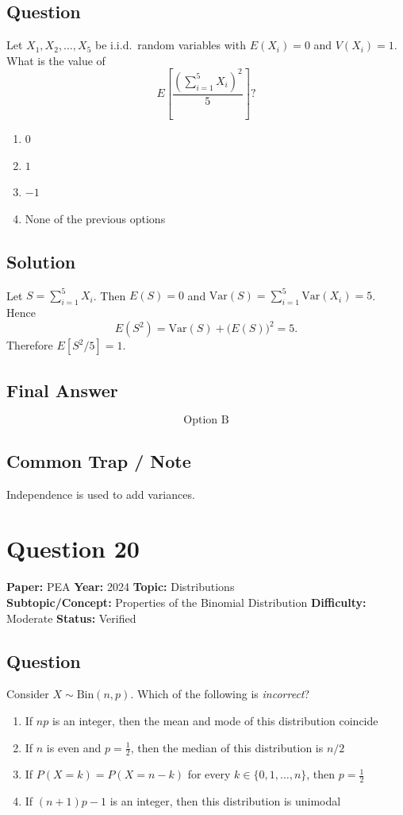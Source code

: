 \documentclass[11pt]{article}
\begin{document}
\subsection*{Question}
Let $X_1,X_2,\dots,X_5$ be i.i.d.\ random variables with $E(X_i)=0$ and $V(X_i)=1$. What is the value of
\[
E\!\left[\frac{(\sum_{i=1}^{5} X_i)^{2}}{5}\right]?
\]
\begin{enumerate}[label=(\Alph*)]
\item $0$
\item $1$
\item $-1$
\item None of the previous options
\end{enumerate}

\subsection*{Solution}
Let $S=\sum_{i=1}^{5} X_i$. Then $E(S)=0$ and $\mathrm{Var}(S)=\sum_{i=1}^{5}\mathrm{Var}(X_i)=5$. Hence
\[
E(S^{2})=\mathrm{Var}(S)+\bigl(E(S)\bigr)^{2}=5.
\]
Therefore $E[S^{2}/5]=1$.

\subsection*{Final Answer}
\[
\boxed{\text{Option B}}
\]

\subsection*{Common Trap / Note}
Independence is used to add variances.

\section*{Question 20}
\textbf{Paper:} PEA \quad \textbf{Year:} 2024 \quad \textbf{Topic:} Distributions \\
\textbf{Subtopic/Concept:} Properties of the Binomial Distribution \quad \textbf{Difficulty:} Moderate \quad \textbf{Status:} Verified

\subsection*{Question}
Consider $X\sim\text{Bin}(n,p)$. Which of the following is \emph{incorrect}?
\begin{enumerate}[label=(\Alph*)]
\item If $np$ is an integer, then the mean and mode of this distribution coincide
\item If $n$ is even and $p=\tfrac12$, then the median of this distribution is $n/2$
\item If $P(X=k)=P(X=n-k)$ for every $k\in\{0,1,\dots,n\}$, then $p=\tfrac12$
\item If $(n+1)p-1$ is an integer, then this distribution is unimodal
\end{enumerate}
\end{document}
